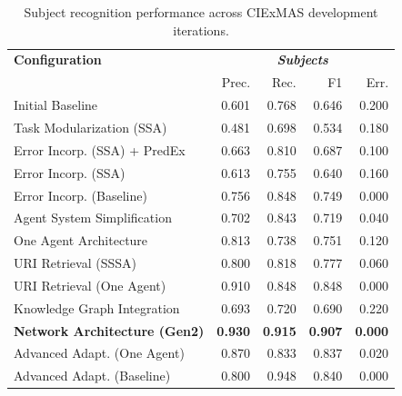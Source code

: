 \documentclass[a4paper,oneside,bibliography=totoc]{scrbook}
\begin{document}
\begin{table}[h]
  \centering
  \begin{tabular}{p{6cm}|rrrr}
    \toprule
    \textbf{Configuration}               & \multicolumn{4}{c}{\textit{\textbf{Subjects}}}                                                    \\
                                         & Prec.                                          & Rec.           & F1             & Err.           \\
    \midrule
    Initial Baseline                     & 0.601                                          & 0.768          & 0.646          & 0.200          \\
    Task Modularization (SSA)            & 0.481                                          & 0.698          & 0.534          & 0.180          \\
    Error Incorp. (SSA) + PredEx         & 0.663                                          & 0.810          & 0.687          & 0.100          \\
    Error Incorp. (SSA)                  & 0.613                                          & 0.755          & 0.640          & 0.160          \\
    Error Incorp. (Baseline)             & 0.756                                          & 0.848          & 0.749          & 0.000          \\
    Agent System Simplification          & 0.702                                          & 0.843          & 0.719          & 0.040          \\
    One Agent Architecture               & 0.813                                          & 0.738          & 0.751          & 0.120          \\
    URI Retrieval (SSSA)                 & 0.800                                          & 0.818          & 0.777          & 0.060          \\
    URI Retrieval (One Agent)            & 0.910                                          & 0.848          & 0.848          & 0.000          \\
    Knowledge Graph Integration          & 0.693                                          & 0.720          & 0.690          & 0.220          \\
    \textbf{Network Architecture (Gen2)} & \textbf{0.930}                                 & \textbf{0.915} & \textbf{0.907} & \textbf{0.000} \\
    Advanced Adapt. (One Agent)          & 0.870                                          & 0.833          & 0.837          & 0.020          \\
    Advanced Adapt. (Baseline)           & 0.800                                          & 0.948          & 0.840          & 0.000          \\
    \bottomrule
  \end{tabular}
  \caption{Subject recognition performance across CIExMAS development iterations.}
  \label{tab:evaluation_subjects_iterations}
\end{table}
\end{document}
